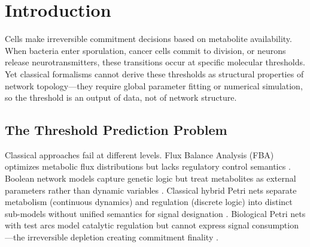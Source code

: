 \documentclass[10pt,letterpaper]{article}
\begin{document}
\section{Introduction}

Cells make irreversible commitment decisions based on metabolite availability. When bacteria enter sporulation, cancer cells commit to division, or neurons release neurotransmitters, these transitions occur at specific molecular thresholds. Yet classical formalisms cannot derive these thresholds as structural properties of network topology---they require global parameter fitting or numerical simulation, so the threshold is an output of data, not of network structure.

\subsection{The Threshold Prediction Problem}
Classical approaches fail at different levels. Flux Balance Analysis (FBA) optimizes metabolic flux distributions but lacks regulatory control semantics \cite{orth2010}. Boolean network models capture genetic logic but treat metabolites as external parameters rather than dynamic variables \cite{kauffman1969}. Classical hybrid Petri nets separate metabolism (continuous dynamics) and regulation (discrete logic) into distinct sub-models without unified semantics for signal designation \cite{liu2013,alla1998}. Biological Petri nets \cite{petri1962,murata1989,reddy1993petri} with test arcs model catalytic regulation but cannot express signal consumption---the irreversible depletion creating commitment finality \cite{heiner2008,chaouiya2007petri}.
\end{document}
